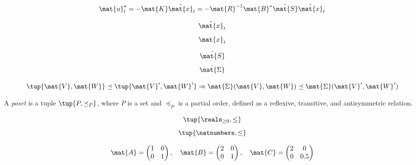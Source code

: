 {\begin{forslides}
        
        \begin{equation*}
            \label{eq:optimal_control}
            \mat{u}_t^\star =-\mat{K}\hat{\mat{x}}_t=-\mat{R}^{-1}\mat{B}^*\bar{\mat{S}}\hat{\mat{x}}_t
        \end{equation*}
        
        \begin{equation*}
            \label{eq:x_estimate}
            \hat{\mat{x}}_t
        \end{equation*}
        \begin{equation*}
            \label{eq:x_real}
            \mat{x}_t
        \end{equation*}
        
        \begin{equation*}
            \label{eq:ric_1}
            \bar{\mat{S}}
        \end{equation*}
        \begin{equation*}
            \label{eq:ric_2}
            \bar{\mat{\Sigma}}
        \end{equation*}
        
        \begin{equation*}
            \label{eq:mon_est}
            \tup{\mat{V},\mat{W}}\preceq \tup{\mat{V}',\mat{W}'} \Rightarrow \mat{\Sigma}(\mat{V},\mat{W})\preceq \mat{\Sigma}(\mat{V}',\mat{W}')
        \end{equation*}
        
        \begin{definition}
            \label{def:poset_cont}
            A \emph{poset} is a tuple $\tup{P,\preceq_P}$, where $P$ is a set and $\preceq_P$ is a partial order, defined as a reflexive, transitive, and antisymmetric relation.
        \end{definition}
        
        \begin{equation*}
            \label{eq:posreals}
            \tup{\reals_{\geq 0},\leq}
        \end{equation*}
        \begin{equation*}
            \label{eq:nats}
            \tup{\natnumbers,\leq}
        \end{equation*}
        
        \begin{equation*}
            \label{eq:matrix_poset}
            \mat{A}=\begin{pmatrix}
                        1& 0\\0& 1
            \end{pmatrix}, \quad \mat{B}=\begin{pmatrix}
                                             2& 0\\0& 1
            \end{pmatrix},\quad \mat{C}=\begin{pmatrix}
                                            2& 0\\0& 0.5
            \end{pmatrix}
        \end{equation*}
        

\end{forslides}}
